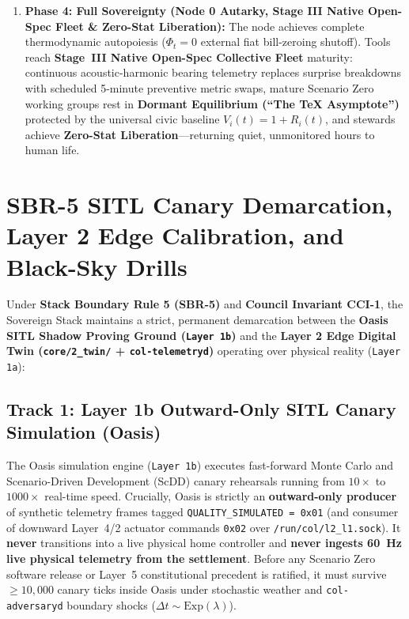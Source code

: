 \begin{enumerate}
    \item \textbf{Phase 4: Full Sovereignty (Node 0 Autarky, Stage III Native Open-Spec Fleet \& Zero-Stat Liberation):}
    The node achieves complete thermodynamic autopoiesis ($\Phi_t = 0$ external fiat bill-zeroing shutoff). Tools reach \textbf{Stage~III Native Open-Spec Collective Fleet} maturity: continuous acoustic-harmonic bearing telemetry replaces surprise breakdowns with scheduled 5-minute preventive metric swaps, mature Scenario Zero working groups rest in \textbf{Dormant Equilibrium (``The TeX Asymptote'')} protected by the universal civic baseline $V_i(t) = 1 + R_i(t)$, and stewards achieve \textbf{Zero-Stat Liberation}---returning quiet, unmonitored hours to human life.
\end{enumerate}

\section{SBR-5 SITL Canary Demarcation, Layer 2 Edge Calibration, and Black-Sky Drills}
\label{sec:twin_loop_cybernetics}

Under \textbf{Stack Boundary Rule 5 (SBR-5)} and \textbf{Council Invariant CCI-1}, the Sovereign Stack maintains a strict, permanent demarcation between the \textbf{Oasis SITL Shadow Proving Ground (\texttt{Layer 1b})} and the \textbf{Layer 2 Edge Digital Twin (\texttt{core/2\_twin/} + \texttt{col-telemetryd})} operating over physical reality (\texttt{Layer 1a}):

\subsection{Track 1: Layer 1b Outward-Only SITL Canary Simulation (Oasis)}
The Oasis simulation engine (\texttt{Layer 1b}) executes fast-forward Monte Carlo and Scenario-Driven Development (ScDD) canary rehearsals running from $10\times$ to $1000\times$ real-time speed. Crucially, Oasis is strictly an \textbf{outward-only producer} of synthetic telemetry frames tagged \texttt{QUALITY\_SIMULATED = 0x01} (and consumer of downward Layer~4/2 actuator commands \texttt{0x02} over \texttt{/run/col/l2\_l1.sock}). It \textbf{never} transitions into a live physical home controller and \textbf{never ingests 60~Hz live physical telemetry from the settlement}. Before any Scenario Zero software release or Layer~5 constitutional precedent is ratified, it must survive $\ge 10{,}000$ canary ticks inside Oasis under stochastic weather and \texttt{col-adversaryd} boundary shocks ($\Delta t \sim \mathrm{Exp}(\lambda)$).

